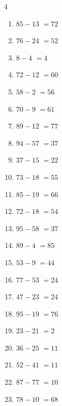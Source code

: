 \begin{multicols}{4}
\begin{enumerate}
  \item $85-13$
        $=72$

  \item $76-24$
        $=52$

  \item $8-4$
        $=4$

  \item $72-12$
        $=60$

  \item $58-2$
        $=56$

  \item $70-9$
        $=61$

  \item $89-12$
        $=77$

  \item $94-57$
        $=37$

  \item $37-15$
        $=22$

  \item $73-18$
        $=55$

\columnbreak %

  \item $85-19$
        $=66$

  \item $72-18$
        $=54$

  \item $95-58$
        $=37$

  \item $89-4$
        $=85$

  \item $53-9$
        $=44$

  \item $77-53$
        $=24$

  \item $47-23$
        $=24$

  \item $95-19$
        $=76$

  \item $23-21$
        $=2$

  \item $36-25$
        $=11$

  \item $52-41$
        $=11$

  \item $87-77$
        $=10$

  \item $78-10$
        $=68$


\end{enumerate}
\end{multicols}
